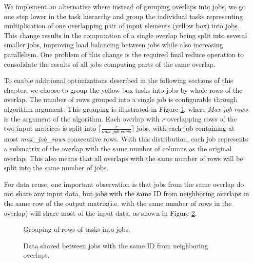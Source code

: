 We implement an alternative where instead of grouping overlaps into jobs, we go one step lower in the task hierarchy and group the individual tasks representing multiplication of one overlapping pair of input elements (yellow box) into jobs. This change results in the computation of a single overlap being split into several smaller jobs, improving load balancing between jobs while also increasing parallelism. One problem of this change is the required final reduce operation to consolidate the results of all jobs computing parts of the same overlap.

To enable additional optimizations described in the following sections of this chapter, we choose to group the yellow box tasks into jobs by whole rows of the overlap. The number of rows grouped into a single job is configurable through algorithm argument. This grouping is illustrated in Figure \ref{fig:row_subset_tasks}, where \textit{Max job rows} is the argument of the algorithm. Each overlap with $r$ overlapping rows of the two input matrices is split into $\lceil \frac{r}{max\_job\_rows} \rceil$ jobs, with each job containing at most \textit{max\_job\_rows} consecutive rows. With this distribution, each job represents a submatrix of the overlap with the same number of columns as the original overlap. This also means that all overlaps with the same number of rows will be split into the same number of jobs.

For data reuse, one important observation is that jobs from the same overlap do not share any input data, but jobs with the same ID from neighboring overlaps in the same row of the output matrix(i.e. with the same number of rows in the overlap) will share most of the input data, as shown in Figure \ref{fig:row_subset_data_reuse}.

\begin{figure}[ht]
	\centering
	\def\svgwidth{0.6\textwidth}
	\fontsize{8}{10}\selectfont
	
	\caption{Grouping of rows of tasks into jobs.}
	\label{fig:row_subset_tasks}
\end{figure}

\begin{figure}[ht]
	\centering
	\def\svgwidth{0.5\textwidth}
	\fontsize{8}{10}\selectfont
	
	\caption{Data shared between jobs with the same ID from neighboring overlaps.}
	\label{fig:row_subset_data_reuse}
\end{figure}

